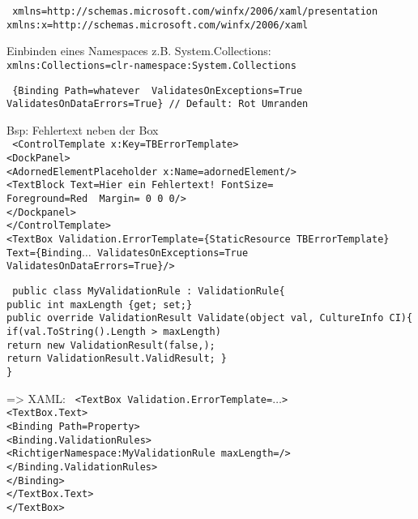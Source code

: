 \texttt{
xmlns=\dq http://schemas.microsoft.com/winfx/2006/xaml/presentation\dq \\
xmlns:x=\dq http://schemas.microsoft.com/winfx/2006/xaml\dq
}

Einbinden eines Namespaces z.B. System.Collections:\\
\texttt{xmlns:Collections=\dq  clr-namespace:System.Collections\dq   
}

\texttt{%
\{Binding Path=\dq  whatever\dq ~ ValidatesOnExceptions=\dq  True\dq   \\
\tab ValidatesOnDataErrors=\dq  True\dq  \} // Default: Rot Umranden}

Bsp: Fehlertext neben der Box\\
\texttt{%
<ControlTemplate x:Key=\dq  TBErrorTemplate\dq   >\\
\tab <DockPanel>\\
\tab \tab <AdornedElementPlaceholder x:Name=\dq  adornedElement\dq   />\\
\tab \tab <TextBlock Text=\dq  Hier ein Fehlertext! \dq   FontSize=\dq   \\
\tab \tab \tab Foreground=\dq  Red\dq ~  Margin= 0 0 0\dq   />\\
\tab </Dockpanel>\\
</ControlTemplate>\\
<TextBox Validation.ErrorTemplate=\dq  \{StaticResource TBErrorTemplate\}\dq   \\
\tab Text=\dq  \{Binding$\dots$ ValidatesOnExceptions=\dq  True\dq   \\ 
\tab ValidatesOnDataErrors=\dq  True\dq    \}\dq   />
}

\texttt{%
public class MyValidationRule : ValidationRule\{		\\
public int maxLength \{get; set;\}					\\
public override ValidationResult Validate(object val, CultureInfo CI)\{ \\
\tab if(val.ToString().Length > maxLength)   \\
\tab \tab return new ValidationResult(false,\dq  \dq  );\\
\tab return ValidationResult.ValidResult;
\}		\\
\}
}

=> XAML:
\texttt{ %
<TextBox Validation.ErrorTemplate=\dq  $\dots$\dq    >		\\
\tab <TextBox.Text>		\\
\tab \tab <Binding Path=\dq  Property\dq    >		\\
\tab \tab \tab <Binding.ValidationRules>		\\
\tab \tab \tab \tab <RichtigerNamespace:MyValidationRule maxLength=\dq  />		\\
\tab \tab \tab </Binding.ValidationRules>		\\
\tab \tab </Binding>		\\
\tab </TextBox.Text>		\\
</TextBox>
}\\

